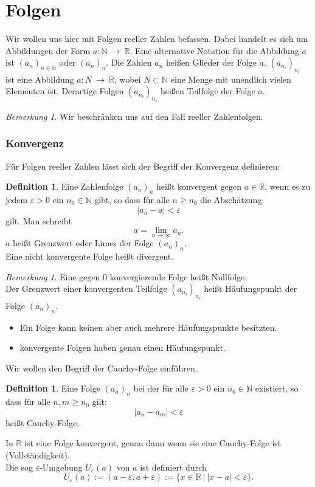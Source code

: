 \documentclass[fontsize=12pt,paper=a4,twoside,bibtotoc,idxtotoc,
liststotoc,pagesize,BCOR1.2cm,DIV15,chapterprefix,pagesize=pdftex]{scrbook}
\theoremstyle{plain}
\theoremstyle{definition}
\newtheorem{df}[equation]{Definition}
\theoremstyle{remark}
\newtheorem{bem}[equation]{Bemerkung}
\begin{document}
\section{Folgen}
Wir wollen uns hier mit Folgen reeller Zahlen befassen. Dabei handelt es sich um 
Abbildungen der Form $a:\mathbb{N} \ \rightarrow \ \mathbb{R}$. 
Eine alternative Notation für die Abbildung $a$ ist $(a_n)_{n \in \mathbb{N}}$ oder $(a_n)_{n}$. 
Die Zahlen $a_n$ heißen Glieder der Folge $a$.
$(a_{n_i})_{n_i}$ ist eine Abbildung $a:N \
\rightarrow \ \mathbb{R}$, wobei $N \subset \mathbb{N}$ eine Menge mit
unendlich vielen Elementen ist. Derartige Folgen $(a_{n_i})_{n_i}$ heißen Teilfolge der Folge $a$.
\begin{bem}
 Wir beschränken uns auf den Fall reeller Zahlenfolgen. 
\end{bem}
\subsubsection{Konvergenz}
Für Folgen reeller Zahlen lässt sich der Begriff der Konvergenz definieren:
\begin{df}
Eine Zahlenfolge $(a_n)_n$ heißt konvergent gegen $a\in \mathbb{R}$, wenn es zu jedem
$\varepsilon >0$ ein $n_0 \in \mathbb{N}$ gibt, so dass für alle $n \geq
n_0$ die Abschätzung 
\[ |a_n - a|< \varepsilon \]
 gilt. Man schreibt
\[ a=\lim_{n \rightarrow \infty} a_n. \]
$a$ heißt Grenzwert oder Limes der Folge $(a_n)_n$.\\
Eine nicht konvergente Folge heißt divergent. 
\end{df}
\begin{bem}
Eine gegen $0$ konvergierende Folge heißt Nullfolge.\\
Der Grenzwert einer konvergenten Teilfolge $(a_{n_i})_{n_i}$ heißt Häufungspunkt der Folge $(a_n)_n$.
\begin{itemize}
 \item Ein Folge kann keinen aber auch mehrere Häufungspunkte besitzten.
 \item konvergente Folgen haben genau einen Häufungspunkt.
\end{itemize}
\end{bem}
Wir wollen den Begriff der Cauchy-Folge einführen.
\begin{df}
 Eine Folge $(a_n)_n$ bei der für
alle $\varepsilon>0$ ein $n_0 \in \mathbb{N}$ existiert, so dass für alle
$n,m \geq n_0$ gilt:
\[|a_n - a_m| < \varepsilon\]
heißt Cauchy-Folge.
\end{df}
 In $\mathbb{R}$ ist eine Folge konvergent,
genau dann wenn sie eine Cauchy-Folge ist (Vollständigkeit).\\
Die sog $\varepsilon$-Umgebung $U_\varepsilon(a)$ von $a$ ist
definiert durch
\[
U_\varepsilon(a) := (a-\varepsilon, a+\varepsilon) := \{ x \in \mathbb{R} \ | \ |x - a| < \varepsilon \}.
\] 
\end{document}
